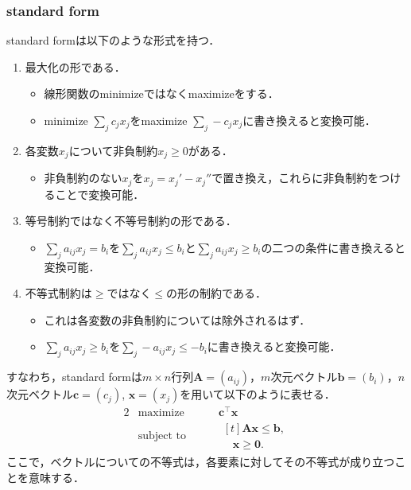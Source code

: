 \documentclass{jsarticle}
\begin{document}
\subsubsection{standard form}
standard formは以下のような形式を持つ．
\begin{enumerate}
\item 最大化の形である．
  \begin{itemize}
  \item 線形関数のminimizeではなくmaximizeをする．
  \item minimize $\sum_j c_jx_j$をmaximize $\sum_j -c_jx_j$に書き換えると変換可能．
  \end{itemize}
\item 各変数$x_j$について非負制約$x_j \ge 0$がある．
  \begin{itemize}
  \item 非負制約のない$x_j$を$x_j = x_j'-x_j''$で置き換え，これらに非負制約をつけることで変換可能．
  \end{itemize}
\item 等号制約ではなく不等号制約の形である．
  \begin{itemize}
  \item $\sum_j a_{ij}x_j = b_i$を$\sum_j a_{ij}x_j \le b_i$と$\sum_j a_{ij}x_j \ge b_i$の二つの条件に書き換えると変換可能．
  \end{itemize}
\item 不等式制約は$\ge$ではなく$\le$の形の制約である．
  \begin{itemize}
  \item これは各変数の非負制約については除外されるはず．
  \item $\sum_j a_{ij}x_j \ge b_i$を$\sum_j -a_{ij}x_j \le -b_i$に書き換えると変換可能．
  \end{itemize}
\end{enumerate}

すなわち，standard formは$m\times n$行列$\bm{A} = (a_{ij})$，$m$次元ベクトル$\bm{b} = (b_i)$，$n$次元ベクトル$\bm{c} = (c_j)$, $\bm{x} = (x_j)$を用いて以下のように表せる．
\begin{alignat*}{2}
  & \text{maximize } & & \bm{c}^\top\bm{x} \\
  & \text{subject to }& \quad & \begin{aligned}[t]
    \bm{A}\bm{x} \le \bm{b}, \\
    \phantom{\bm{A}}\bm{x} \ge \bm{0}.
  \end{aligned}
\end{alignat*}
ここで，ベクトルについての不等式は，各要素に対してその不等式が成り立つことを意味する．
\end{document}
